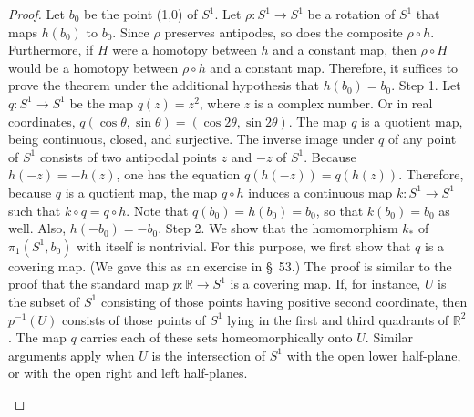 \begin{proof}
Let \(b_{0}\) be the point (1,0) of \(S^{1}\). Let \(\rho : S^{1} \rightarrow {S}^{1}\) be a rotation of \(S^{1}\) that maps \(h( b_{0})\) to \(b_{0}\). Since \(\rho\) preserves antipodes, so does the composite \(\rho \circ h\). Furthermore, if \(H\) were a homotopy between \(h\) and a constant map, then \(\rho \circ H\) would be a homotopy between \(\rho \circ h\) and a constant map. Therefore, it suffices to prove the theorem under the additional hypothesis that \(h( b_{0}) = b_{0}\).
Step 1. Let \(q : S^{1} \rightarrow {S}^{1}\) be the map \(q( z) = z^{2}\), where \(z\) is a complex number. Or in real coordinates, \(q( {\cos \theta ,\sin \theta }) = ( {\cos {2\theta },\sin {2\theta }})\). The map \(q\) is a quotient map, being continuous, closed, and surjective. The inverse image under \(q\) of any point of \(S^{1}\) consists of two antipodal points \(z\) and \(- z\) of \(S^{1}\). Because \(h( {-z}) = - h( z)\), one has the equation \(q( {h( {-z}) }) = q( {h( z) })\). Therefore, because \(q\) is a quotient map, the map \(q \circ h\) induces a continuous map \(k : S^{1} \rightarrow {S}^{1}\) such that \(k \circ q = q \circ h\). Note that \(q( b_{0}) = h( b_{0}) = b_{0}\), so that \(k( b_{0}) = b_{0}\) as well. Also, \(h( {-b_{0}}) = - b_{0}\). Step 2. We show that the homomorphism \(k_{ * }\) of \({\pi }_{1}( {S^{1},b_{0}})\) with itself is nontrivial. For this purpose, we first show that \(q\) is a covering map. (We gave this as an exercise in \S\ 53.) The proof is similar to the proof that the standard map \(p : \mathbb{R} \rightarrow {S}^{1}\) is a covering map. If, for instance, \(U\) is the subset of \(S^{1}\) consisting of those points having positive second coordinate, then \(p^{-1}( U)\) consists of those points of \(S^{1}\) lying in the first and third quadrants of \(\mathbb{R}^{2}\). The map \(q\) carries each of these sets homeomorphically onto \(U\). Similar arguments apply when \(U\) is the intersection of \(S^{1}\) with the open lower half-plane, or with the open right and left half-planes.

\par\nopagebreak
\begin{center}
	\label{fig:com_57_0}
\end{center}
\par\nopagebreak 


\end{proof}
